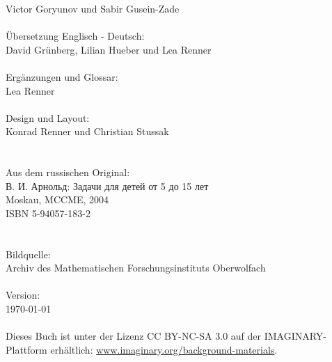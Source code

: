 \null\quad Victor Goryunov und Sabir Gusein-Zade\\
\\
Übersetzung Englisch - Deutsch:\\
\null\quad David Grünberg, Lilian Hueber und Lea Renner\\
\\
Ergänzungen und Glossar:\\
\null\quad Lea Renner\\
\\
Design und Layout:\\
\null\quad Konrad Renner und Christian Stussak\\
\\
\\
Aus dem russischen Original:\\
\null\quad \textrussian{В. И. Арнольд: Задачи для детей от 5 до 15 лет}\\
\null\quad Moskau, MCCME, 2004\\
\null\quad ISBN 5-94057-183-2\\
\\
\\
Bildquelle:\\ 
\null\quad Archiv des Mathematischen Forschungsinstituts Oberwolfach\\
\\
Version:\\
\null\quad \today\\
\\
Dieses Buch ist unter der Lizenz CC BY-NC-SA 3.0 auf der IMAG\-I\-NARY-Plattform erhältlich: \href{http://www.imaginary.org/background-materials}{www.imaginary.org/background-materials}.%
%
\clearpage
\thispagestyle{empty}
\null


